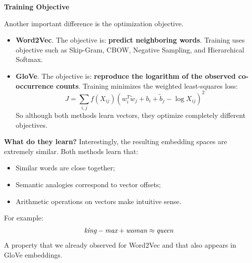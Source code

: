 \highspace
\begin{flushleft}
    \textcolor{Green3}{ \textbf{Training Objective}}
\end{flushleft}
Another important difference is the optimization objective.
\begin{itemize}
    \item \textbf{Word2Vec}. The objective is: \textbf{predict neighboring words}. Training uses objective such as Skip-Gram, CBOW, Negative Sampling, and Hierarchical Softmax.

    \item \textbf{GloVe}. The objective is: \textbf{reproduce the logarithm of the observed co-occurrence counts}. Training minimizes the weighted least-squares loss:
    \begin{equation*}
        J = \sum_{i,j} f(X_{ij}) \left(w_i^T \tilde{w}_j + b_i + \tilde{b}_j - \log X_{ij}\right)^2
    \end{equation*}
    So although both methods learn vectors, they optimize completely different objectives.
\end{itemize}

\highspace
\textcolor{Green3}{ \textbf{What do they learn?}} Interestingly, the resulting embedding spaces are extremely similar. Both methods learn that:
\begin{itemize}
    \item Similar words are close together;
    \item Semantic analogies correspond to vector offsets;
    \item Arithmetic operations on vectors make intuitive sense.
\end{itemize}
For example:
\begin{equation*}
    \emph{king} - \emph{max} + \emph{woman} \approx \emph{queen}
\end{equation*}
A property that we already observed for Word2Vec and that also appears in GloVe embeddings.

